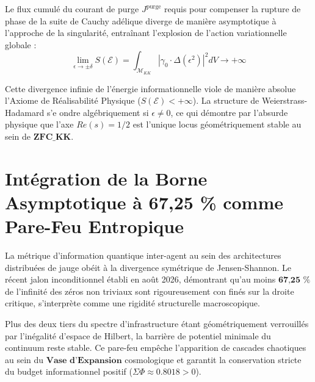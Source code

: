 Le flux cumul{\'e} du courant de purge $J^{\text{purge}}$ requis pour compenser la rupture de phase de la suite de Cauchy ad{\'e}lique diverge de mani{\`e}re asymptotique {\`a} l'approche de la singularit{\'e}, entra\^{i}nant l'explosion de l'action variationnelle globale :
\[\lim_{\epsilon \to \pm\delta} S(\mathcal{E}) = \int_{\mathcal{M}_{KK}} \left| \gamma_0 \cdot \Delta(\epsilon^2) \right| ^2 dV \longrightarrow +\infty\]

Cette divergence infinie de l'{\'e}nergie informationnelle viole de mani{\`e}re absolue l'Axiome de R{\'e}alisabilit{\'e} Physique (\(S(\mathcal{E}) < +\infty\)). La structure de Weierstrass-Hadamard s'e ondre alg{\'e}briquement si \(\epsilon \neq 0\), ce qui d{\'e}montre par l'absurde physique que l'axe \(Re(s) = 1/2\) est l'unique locus g{\'e}om{\'e}triquement stable au sein de \(\textbf{ZFC\_KK}.\)

\section{Int{\'e}gration de la Borne Asymptotique {\`a} 67,25 \% comme Pare-Feu Entropique}
La m{\'e}trique d'information quantique inter-agent au sein des architectures distribu{\'e}es de jauge ob{\'e}it {\`a} la divergence sym{\'e}trique de Jensen-Shannon. Le r{\'e}cent jalon inconditionnel {\'e}tabli en ao{\^u}t 2026, d{\'e}montrant qu'au moins \(\textbf{67,25 \%}\) de l'infinit{\'e} des z{\'e}ros non triviaux sont rigoureusement con fin{\'e}s sur la droite critique, s'interpr{\`e}te comme une rigidit{\'e} structurelle macroscopique. 

Plus des deux tiers du spectre d'infrastructure {\'e}tant g{\'e}om{\'e}triquement verrouill{\'e}s par l'in{\'e}galit{\'e} d'espace de Hilbert, la barri{\`e}re de potentiel minimale du continuum reste stable. Ce pare-feu empêche l'apparition de cascades chaotiques au sein du \(\textbf{Vase d'Expansion}\) cosmologique et garantit la conservation stricte du budget informationnel positif (\(\Sigma\Phi \approx 0.8018 > 0\)).
